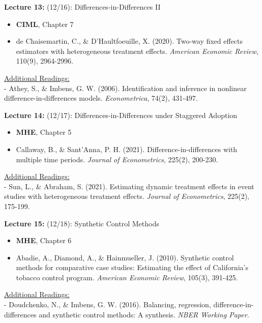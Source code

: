 \documentclass[12pt]{article}
\begin{document}
\vspace{2em}
\noindent\textbf{Lecture 13:} (12/16): Differences-in-Differences II \\
\vspace{1em}
\begin{itemize}
    \item \textbf{CIML}, Chapter 7
    \item de Chaisemartin, C., \& D’Haultfoeuille, X. (2020). Two-way fixed effects estimators with heterogeneous treatment effects. \textit{American Economic Review}, 110(9), 2964-2996.
\end{itemize}
\vspace{1em}
\underline{Additional Readings:} \\
\hspace{1em} - Athey, S., \& Imbens, G. W. (2006). Identification and inference in nonlinear difference-in-differences models. \textit{Econometrica}, 74(2), 431-497.

\vspace{2em}
\noindent\textbf{Lecture 14:} (12/17): Differences-in-Differences under Staggered Adoption \\
\vspace{1em}
\begin{itemize}
    \item \textbf{MHE}, Chapter 5
    \item Callaway, B., \& Sant’Anna, P. H. (2021). Difference-in-differences with multiple time periods. \textit{Journal of Econometrics}, 225(2), 200-230.
\end{itemize}
\vspace{1em}
\underline{Additional Readings:} \\
\hspace{1em} - Sun, L., \& Abraham, S. (2021). Estimating dynamic treatment effects in event studies with heterogeneous treatment effects. \textit{Journal of Econometrics}, 225(2), 175-199.

\vspace{2em}
\noindent\textbf{Lecture 15:} (12/18): Synthetic Control Methods \\
\vspace{1em}
\begin{itemize}
    \item \textbf{MHE}, Chapter 6
    \item Abadie, A., Diamond, A., \& Hainmueller, J. (2010). Synthetic control methods for comparative case studies: Estimating the effect of California's tobacco control program. \textit{American Economic Review}, 105(3), 391-425.
\end{itemize}
\vspace{1em}
\underline{Additional Readings:} \\
\hspace{1em} - Doudchenko, N., \& Imbens, G. W. (2016). Balancing, regression, difference-in-differences and synthetic control methods: A synthesis. \textit{NBER Working Paper}.
\end{document}
